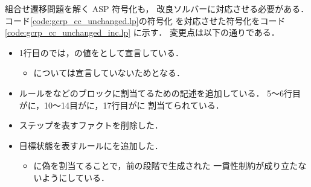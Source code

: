 組合せ遷移問題を解く ASP 符号化も，
改良ソルバーに対応させる必要がある．
コード\ref{code:gcrp_cc_unchanged.lp}の符号化
を対応させた符号化をコード\ref{code:gcrp_cc_unchanged_inc.lp}
に示す．
変更点は以下の通りである．
\begin{itemize}
  \item 1行目のでは，の値をとして宣言している．
  \begin{itemize}
    \item {}については宣言していないためとなる．
  \end{itemize}

  \item ルールをなどのブロックに割当てるための記述を追加している．
  5～6行目がに，10～14目がに，17行目がに
  割当てられている．

  \item ステップを表すファクトを削除した．
  \item 目標状態を表すルールにを追加した．
  \begin{itemize}
    \item {}に偽を割当てることで，前の段階で生成された
    一貫性制約が成り立たないようにしている．
  \end{itemize}
\end{itemize}

